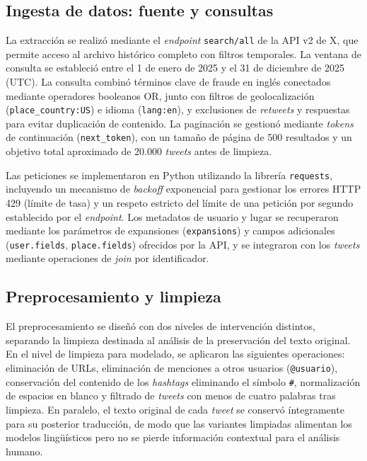 \subsection{Ingesta de datos: fuente y consultas}

La extracción se realizó mediante el \textit{endpoint} \texttt{search/all} de la API v2 de X, que permite acceso al archivo histórico completo con filtros temporales. La ventana de consulta se estableció entre el 1 de enero de 2025 y el 31 de diciembre de 2025 (UTC). La consulta combinó términos clave de fraude en inglés conectados mediante operadores booleanos OR, junto con filtros de geolocalización (\texttt{place\_country:US}) e idioma (\texttt{lang:en}), y exclusiones de \textit{retweets} y respuestas para evitar duplicación de contenido. La paginación se gestionó mediante \textit{tokens} de continuación (\texttt{next\_token}), con un tamaño de página de 500 resultados y un objetivo total aproximado de 20.000 \textit{tweets} antes de limpieza.

Las peticiones se implementaron en Python utilizando la librería \texttt{requests}, incluyendo un mecanismo de \textit{backoff} exponencial para gestionar los errores HTTP 429 (límite de tasa) y un respeto estricto del límite de una petición por segundo establecido por el \textit{endpoint}. Los metadatos de usuario y lugar se recuperaron mediante los parámetros de expansiones (\texttt{expansions}) y campos adicionales (\texttt{user.fields}, \texttt{place.fields}) ofrecidos por la API, y se integraron con los \textit{tweets} mediante operaciones de \textit{join} por identificador.

\subsection{Preprocesamiento y limpieza}

El preprocesamiento se diseñó con dos niveles de intervención distintos, separando la limpieza destinada al análisis de la preservación del texto original. En el nivel de limpieza para modelado, se aplicaron las siguientes operaciones: eliminación de URLs, eliminación de menciones a otros usuarios (\texttt{@usuario}), conservación del contenido de los \textit{hashtags} eliminando el símbolo \texttt{\#}, normalización de espacios en blanco y filtrado de \textit{tweets} con menos de cuatro palabras tras limpieza. En paralelo, el texto original de cada \textit{tweet} se conservó íntegramente para su posterior traducción, de modo que las variantes limpiadas alimentan los modelos lingüísticos pero no se pierde información contextual para el análisis humano.

